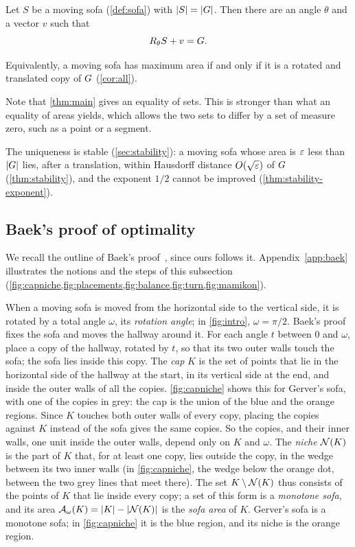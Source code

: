 \begin{theorem}\label{thm:main}
  Let $S$ be a moving sofa (\cref{def:sofa}) with $\lvert S\rvert=\lvert G\rvert$. Then there
  are an angle $\theta$ and a vector $v$ such that
  \[
    R_\theta S+v=G .
  \]
\end{theorem}

Equivalently, a moving sofa has maximum area if and only if it is a rotated and
translated copy of $G$ (\cref{cor:all}).

Note that \cref{thm:main} gives an equality of sets. This is stronger than what
an equality of areas yields, which allows the two sets to differ by a set of
measure zero, such as a point or a segment.

The uniqueness is stable (\cref{sec:stability}): a moving sofa whose area is
$\varepsilon$ less than $\lvert G\rvert$ lies, after a translation, within Hausdorff distance
$O(\sqrt{\varepsilon})$ of $G$ (\cref{thm:stability}), and the exponent $1/2$ cannot
be improved (\cref{thm:stability-exponent}).

\subsection{Baek's proof of optimality}\label{sec:baek}

We recall the outline of Baek's proof~\cite{Baek}, since ours follows it.
Appendix~\ref{app:baek} illustrates the notions and the steps of this subsection
(\cref{fig:capniche,fig:placements,fig:balance,fig:turn,fig:mamikon}).

When a moving sofa is moved from the horizontal side to the vertical side, it is
rotated by a total angle $\omega$, its \emph{rotation angle}; in
\cref{fig:intro}, $\omega=\pi/2$. Baek's proof fixes the sofa and moves the
hallway around it. For each angle $t$ between $0$ and $\omega$, place a copy of
the hallway, rotated by $t$, so that its two outer walls touch the sofa; the
sofa lies inside this copy. The \emph{cap} $K$ is the set of points that lie in
the horizontal side of the hallway at the start, in its vertical side at the
end, and inside the outer walls of all the copies. \cref{fig:capniche} shows
this for Gerver's sofa, with one of the copies in grey: the cap is the union of
the blue and the orange regions. Since $K$ touches both outer walls of every
copy, placing the copies against $K$ instead of the sofa gives the same copies.
So the copies, and their inner walls, one unit inside the outer walls, depend
only on $K$ and $\omega$. The \emph{niche} $\mathcal{N}(K)$ is the part of $K$ that, for
at least one copy, lies outside the copy, in the wedge between its two inner
walls (in \cref{fig:capniche}, the wedge below the orange dot, between the two
grey lines that meet there). The set $K\setminus\mathcal{N}(K)$ thus consists of the
points of $K$ that lie inside every copy; a set of this form is a \emph{monotone
sofa}, and its area $\mathcal{A}_\omega(K)=\lvert K\rvert-\lvert \mathcal{N}(K)\rvert$ is the \emph{sofa area}
of $K$. Gerver's sofa is a monotone sofa; in \cref{fig:capniche} it is the blue
region, and its niche is the orange region.

